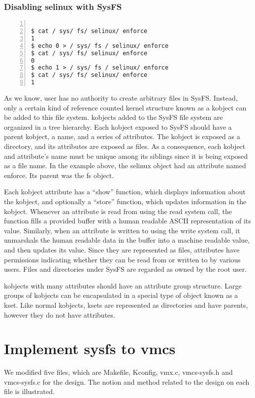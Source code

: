 \documentclass[10pt,draftclsnofoot,journal,compsoc,onecolumn]{IEEEtran}
\begin{document}
\subsubsection{Disabling selinux with SysFS}
\begin{lstlisting}[numbers=left]

$ cat / sys/ fs/ selinux/ enforce
1
$ echo 0 > / sys/ fs / selinux/ enforce
$ cat / sys/ fs/ selinux/ enforce
0
$ echo 1 > / sys/ fs / selinux/ enforce
$ cat / sys/ fs/ selinux/ enforce
1
\end{lstlisting}

\par As we know, user has no authority to create arbitrary files in SysFS. Instead, only a certain kind of reference counted kernel structure known as a kobject can be added to this file system. kobjects added to the SysFS file system are organized in a tree hierarchy. Each kobject exposed to SysFS should have a parent kobject, a name, and a series of attributes. The kobject is exposed as a directory, and its attributes are exposed as files. As a consequence, each kobject and attribute’s name must be unique among its siblings since it is being exposed as a file name. In the example above, the selinux object had an attribute named enforce. Its parent was the fs object.

\par Each kobject attribute has a “show” function, which displays information about the kobject, and optionally a “store” function, which updates information in the kobject. Whenever an attribute is read from using the read system call, the function fills a provided buffer with a human readable ASCII representation of its value. Similarly, when an attribute is written to using the write system call, it unmarshals the human readable data in the buffer into a machine readable value, and then updates its value. Since they are represented as files, attributes have permissions indicating whether they can be read from or written to by various users. Files and directories under SysFS are regarded as owned by the root user.

\par kobjects with many attributes should have an attribute group structure. Large groups of kobjects can be encapsulated in a special type of object known as a kset. Like normal kobjects, ksets are represented as directories and have parents, however they do not have attributes.

\section{Implement sysfs to vmcs}
	We modified five files, which are Makefile, Kconfig, vmx.c, vmcs-sysfs.h and vmcs-sysfs.c for the design. The notion and method related to the design on each file is illustrated. 
\end{document}
